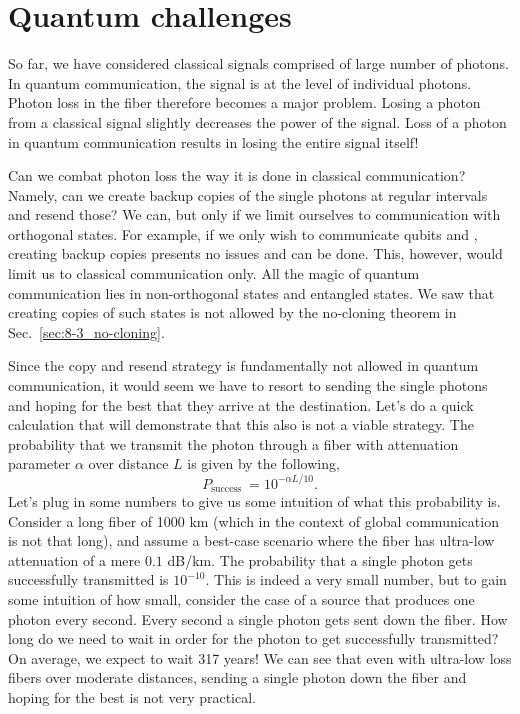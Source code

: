 \section{Quantum challenges}
\label{sec:quantum_challenges}

So far, we have considered classical signals comprised of large number of photons.
In quantum communication, the signal is at the level of individual photons.
Photon loss in the fiber therefore becomes a major problem.
Losing a photon from a classical signal slightly decreases the power of the signal.
Loss of a photon in quantum communication results in losing the entire signal itself!

Can we combat photon loss the way it is done in classical communication?
Namely, can we create backup copies of the single photons at regular intervals and resend those?
We can, but only if we limit ourselves to communication with orthogonal states.
For example, if we only wish to communicate qubits  and , creating backup copies presents no issues and can be done.
This, however, would limit us to classical communication only.
All the magic of quantum communication lies in non-orthogonal states and entangled states.
We saw that creating copies of such states is not allowed by the no-cloning theorem in Sec.~\ref{sec:8-3_no-cloning}.

Since the copy and resend strategy is fundamentally not allowed in quantum communication, it would seem we have to resort to sending the single photons and hoping for the best that they arrive at the destination.
Let's do a quick calculation that will demonstrate that this also is not a viable strategy.
The probability that we transmit the photon through a fiber with attenuation parameter $\alpha$ over distance $L$ is given by the following,
\begin{equation}
    P_{\text {success }}=10^{-\alpha L / 10}.
\end{equation}
Let's plug in some numbers to give us some intuition of what this probability is.
Consider a long fiber of 1000 km (which in the context of global communication is not that long), and assume a best-case scenario where the fiber has ultra-low attenuation of a mere $0.1$ dB/km.
The probability that a single photon gets successfully transmitted is $10^{-10}$.
This is indeed a very small number, but to gain some intuition of how small, consider the case of a source that produces one photon every second.
Every second a single photon gets sent down the fiber.
How long do we need to wait in order for the photon to get successfully transmitted?
On average, we expect to wait 317 years!
We can see that even with ultra-low loss fibers over moderate distances, sending a single photon down the fiber and hoping for the best is not very practical.

